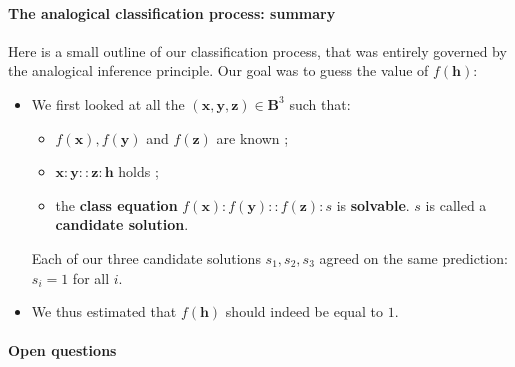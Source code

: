 \paragraph{The analogical classification process: summary\\}

Here is a small outline of our classification process, that was entirely
governed by the analogical inference principle. Our goal was to guess the value
of $f(\mathbf{h})$:

\begin{itemize}
  \item We first looked at all the $(\mathbf{x}, \mathbf{y}, \mathbf{z}) \in
    \mathbf{B}^3$ such that:
    \begin{itemize}
      \item $f(\mathbf{x}), f(\mathbf{y})$ and $f(\mathbf{z})$ are known ;
      \item $\mathbf{x}:\mathbf{y}::\mathbf{z}:\mathbf{h}$ holds ;
      \item the \textbf{class equation} $f(\mathbf{x}) :f(\mathbf{y}) ::
        f(\mathbf{z}) :s$ is \textbf{solvable}. $s$ is called a
        \textbf{candidate solution}.
    \end{itemize}
    Each of our three candidate solutions $s_1, s_2, s_3$ agreed on the same prediction:
    $s_i = 1$ for all $i$.
  \item We thus estimated that $f(\mathbf{h})$ should indeed be equal to $1$.
\end{itemize}

\paragraph{Open questions\\}

